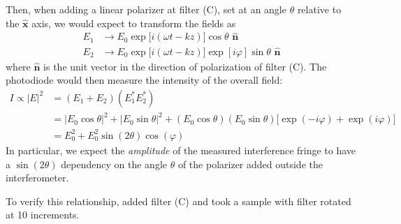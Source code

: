 \documentclass[letter]{article}
\newcommand{\BVEC}[1]{\hat{\boldsymbol{#1}}}
\begin{document}
Then, when adding a linear polarizer at filter (C), set at an angle $\theta$ relative to the $\BVEC{x}$ axis, we would expect to transform the fields as
\begin{align}
E_1 &\to E_0 \exp \big[ i (\omega t - kz) \big] \cos\theta \,\, \BVEC{n} \\
E_2 &\to E_0 \exp \big[ i (\omega t - kz) \big] \exp[i\varphi] \sin\theta \,\, \BVEC{n}
\end{align}
where $\BVEC{n}$ is the unit vector in the direction of polarization of filter (C). The photodiode would then measure the intensity of the overall field:
\begin{align}
I \propto |E|^2 
&=
(E_1 + E_2) (E_1^\ast E_2^\ast)
\\&=
|E_0 \cos\theta|^2 + |E_0 \sin\theta|^2 + (E_0 \cos\theta)(E_0 \sin\theta) \big[ \exp(-i\varphi) + \exp(i \varphi) \big]
\\&=
E_0^2 + E_0^2 \sin(2\theta) \cos(\varphi)
\end{align}
In particular, we expect the \textit{amplitude} of the measured interference fringe to have a $\sin(2\theta)$ dependency on the angle $\theta$ of the polarizer added outside the interferometer.

To verify this relationship, added filter (C) and took a sample with filter rotated at \qty{10}{\deg} increments.
\end{document}
